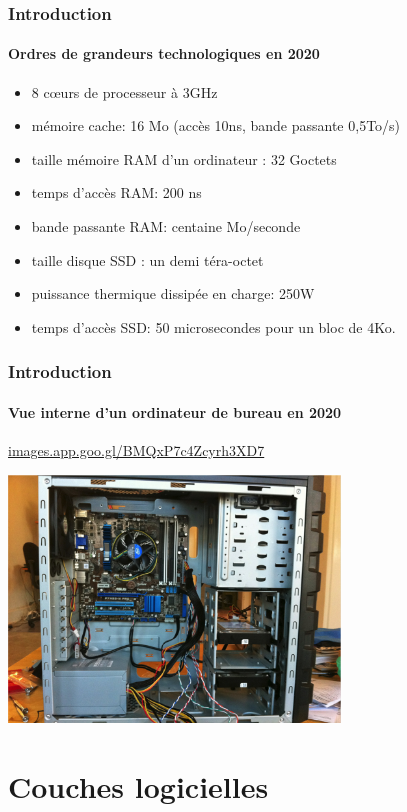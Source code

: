 \documentclass[xcolor=svgnames,final,smaller,a4]{beamer}
\begin{document}
\begin{frame}
  \frametitle{Introduction}
  \framesubtitle{Ordres de grandeurs technologiques en 2020}
 
\begin{itemize}
\item 8 c{\oe}urs de processeur à 3GHz
\item mémoire cache: 16 Mo (accès 10ns, bande passante 0,5To/s)
\item taille mémoire RAM d'un ordinateur : 32 Goctets
\item temps d'accès RAM: 200 ns
\item bande passante RAM: centaine Mo/seconde
\item taille disque SSD : un demi téra-octet
\item puissance thermique dissipée en charge: 250W
\item temps d'accès SSD: 50 microsecondes pour un bloc de 4Ko.
\end{itemize}

\end{frame}

\begin{frame}

  \frametitle{Introduction}
  \framesubtitle{Vue interne d'un ordinateur de bureau en 2020}

\href{https://images.app.goo.gl/BMQxP7c4Zcyrh3XD7}{images.app.goo.gl/BMQxP7c4Zcyrh3XD7}

\includegraphics[width=0.66\textwidth]{interieur-ordinateur.png}
\end{frame}


\section{Couches logicielles}
\end{document}
